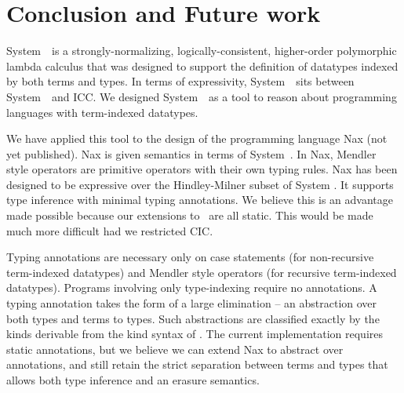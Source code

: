 \section{Conclusion and Future work}
\label{sec:concl}

System~\Fi\ is a strongly-normalizing, logically-consistent, higher-order
polymorphic lambda calculus that was designed to support the
definition of datatypes indexed by both terms and types.
In terms of expressivity, System~\Fi\ sits between System~\Fw\ and ICC.
We designed System~\Fi\ as a tool to reason about programming
languages with term-indexed datatypes. 

We have applied this tool to the design of the programming language Nax (not yet published).
Nax is given semantics in terms of System~\Fi . In Nax, Mendler style operators
are primitive operators with their own typing rules. Nax has been designed to
be expressive over the Hindley-Milner subset of System \Fi. It supports type
inference with minimal typing annotations. We believe this is an advantage
made possible because our extensions to \Fw\ are all static. This would be made
much more difficult had we restricted CIC.

Typing annotations are necessary only
on case statements (for non-recursive term-indexed datatypes)
and Mendler style operators (for recursive term-indexed datatypes).
Programs involving only type-indexing require no annotations.
A typing annotation takes the form of a large elimination --
an abstraction over both types and terms to types. Such abstractions
are classified exactly by the kinds derivable from the kind
syntax of \Fi.   The current implementation requires
static annotations, but we believe we can extend Nax to abstract over
annotations, and still retain the strict separation between terms and types
that allows both type inference and an erasure semantics.
 
